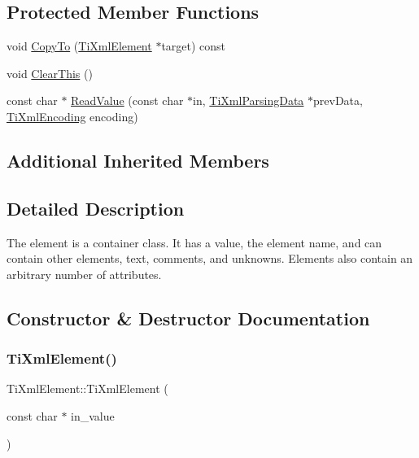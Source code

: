 \subsection*{Protected Member Functions}
\begin{DoxyCompactItemize}
\item 
void \hyperlink{class_ti_xml_element_ab931f2208ed76ba03465d8a1f86b5935}{Copy\+To} (\hyperlink{class_ti_xml_element}{Ti\+Xml\+Element} $\ast$target) const
\item 
void \hyperlink{class_ti_xml_element_a5670933ec2d7d9763b9891acc05d7f7d}{Clear\+This} ()
\item 
const char $\ast$ \hyperlink{class_ti_xml_element_ac786bce103042d3837c4cc2ff6967d41}{Read\+Value} (const char $\ast$in, \hyperlink{class_ti_xml_parsing_data}{Ti\+Xml\+Parsing\+Data} $\ast$prev\+Data, \hyperlink{tinyxml_8h_a88d51847a13ee0f4b4d320d03d2c4d96}{Ti\+Xml\+Encoding} encoding)
\end{DoxyCompactItemize}
\subsection*{Additional Inherited Members}


\subsection{Detailed Description}
The element is a container class. It has a value, the element name, and can contain other elements, text, comments, and unknowns. Elements also contain an arbitrary number of attributes. 

\subsection{Constructor \& Destructor Documentation}
\mbox{\label{class_ti_xml_element_a01bc3ab372d35da08efcbbe65ad90c60}} 
\subsubsection{\texorpdfstring{Ti\+Xml\+Element()}{TiXmlElement()}\hspace{0.1cm}{\footnotesize\ttfamily [1/2]}}
{\footnotesize\ttfamily Ti\+Xml\+Element\+::\+Ti\+Xml\+Element (\begin{DoxyParamCaption}\item[{const char $\ast$}]{in\+\_\+value }\end{DoxyParamCaption})}



